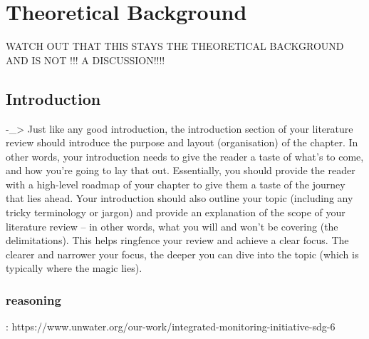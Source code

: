 
\chapter{Theoretical Background} %

\label{Chapter2} %
WATCH  OUT THAT THIS STAYS THE THEORETICAL BACKGROUND AND IS NOT !!! A DISCUSSION!!!!

\section{Introduction}


-_> Just like any good introduction, the introduction section of your literature review should introduce the purpose and layout (organisation) of the chapter. In other words, your introduction needs to give the reader a taste of what’s to come, and how you’re going to lay that out. Essentially, you should provide the reader with a high-level roadmap of your chapter to give them a taste of the journey that lies ahead.
Your introduction should also outline your topic (including any tricky terminology or jargon) and provide an explanation of the scope of your literature review – in other words, what you will and won’t be covering (the delimitations). This helps ringfence your review and achieve a clear focus. The clearer and narrower your focus, the deeper you can dive into the topic (which is typically where the magic lies). 




\subsection{reasoning}:
https://www.unwater.org/our-work/integrated-monitoring-initiative-sdg-6

